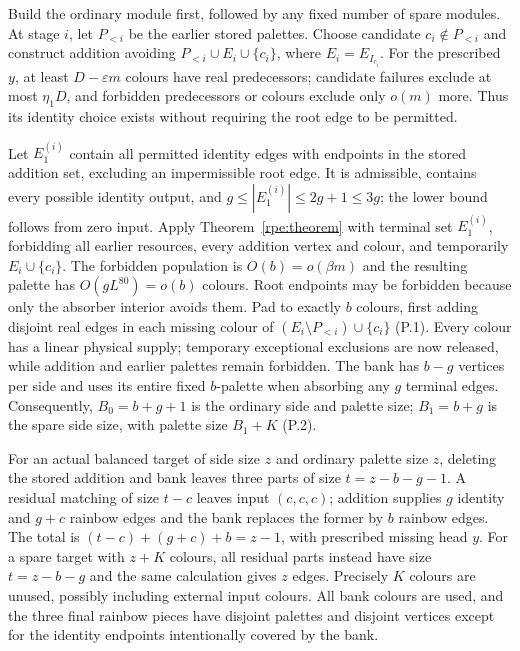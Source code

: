 Build the ordinary module first, followed by any fixed number of
spare modules.  At stage $i$, let $P_{<i}$ be the earlier stored palettes.  Choose candidate $c_i\notin{}P_{<i}$ and construct addition avoiding $P_{<i}\cup{}E_i\cup\{c_i\}$, where $E_i=E_{I_{c_i}}$. For the prescribed $y$, at least $D-\varepsilon{}m$ colours have real predecessors; candidate failures exclude at most $\eta_1D$, and forbidden predecessors or colours exclude only $o(m)$ more. Thus its identity choice exists without requiring the root edge
to be permitted.

Let $E_1^{(i)}$ contain all permitted identity edges with endpoints in the stored addition set, excluding an impermissible root edge.
It is admissible, contains every possible identity output, and $g\le|E_1^{(i)}|\le2g+1\le3g$; the lower bound follows from zero input.  Apply Theorem~\ref{rpe:theorem} with terminal set $E_1^{(i)}$, forbidding all earlier resources, every addition vertex and colour, and temporarily $E_i\cup\{c_i\}$.  The forbidden population is $O(b)=o(\beta{}m)$ and the resulting palette has $O(gL^{80})=o(b)$ colours.  Root endpoints may be forbidden because only the absorber interior avoids them.  Pad to exactly $b$ colours, first adding disjoint real edges in each missing colour of $(E_i\setminus{}P_{<i})\cup\{c_i\}$ \textup{(P.1)}. Every colour has a linear physical supply; temporary exceptional
exclusions are now released, while addition and earlier palettes
remain forbidden.  The bank has $b-g$ vertices per side and uses its entire fixed $b$-palette when absorbing any $g$ terminal edges.
Consequently, $B_0=b+g+1$ is the ordinary side and palette size; $B_1=b+g$ is the spare side size, with palette size $B_1+K$ \textup{(P.2)}.

For an actual balanced target of side size $z$ and ordinary palette size $z$, deleting the stored addition and bank leaves three parts of size $t=z-b-g-1$.  A residual matching of size $t-c$ leaves input $(c,c,c)$; addition supplies $g$ identity and $g+c$ rainbow edges and the bank replaces the former by $b$ rainbow edges. The total is $(t-c)+(g+c)+b=z-1$, with prescribed missing head $y$. For a spare target with $z+K$ colours, all residual parts instead have size $t=z-b-g$ and the same calculation gives $z$ edges. Precisely $K$ colours are unused, possibly including external input colours.  All bank colours are used, and the three final rainbow
pieces have disjoint palettes and disjoint vertices except for the
identity endpoints intentionally covered by the bank.

